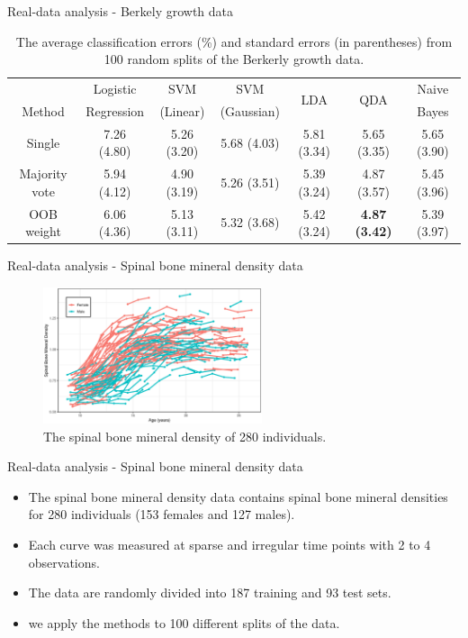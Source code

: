 \documentclass{beamer}
\begin{document}
\begin{frame}{Real-data analysis - Berkely growth data}
	\begin{table}[ht]
		\footnotesize
		\centering
		\caption{The average classification errors (\%) and standard errors (in parentheses) from 100 random splits of the Berkerly growth data.}\label{t4}
		\tabcolsep=6.5pt
		\tiny
		\begin{tabular}{ccccccc}
			\hline \hline
			& Logistic   & SVM      & SVM        &  \multirow{2}{*}{LDA}   &  \multirow{2}{*}{QDA}   & Naive \\
			Method & Regression & (Linear) & (Gaussian) &  &  & Bayes \\ 
			\hline
			Single        & 7.26 (4.80) & 5.26 (3.20) & 5.68 (4.03) & 5.81 (3.34) & 5.65 (3.35) & 5.65 (3.90) \\ 
			Majority vote & 5.94 (4.12) & 4.90 (3.19) & 5.26 (3.51) & 5.39 (3.24) & 4.87 (3.57) & 5.45 (3.96) \\ 
			OOB weight    & 6.06 (4.36) & 5.13 (3.11) & 5.32 (3.68) & 5.42 (3.24) & \textbf{4.87 (3.42)} & 5.39 (3.97) \\
			\hline \hline
		\end{tabular}
	\end{table}
\end{frame}

\begin{frame}{Real-data analysis - Spinal bone mineral density data}
	\begin{figure}[h]
		\centering
		\includegraphics[height=4cm,keepaspectratio=true]{img/spnbmd.eps}
		\caption{The spinal bone mineral density of 280 individuals.}
		\label{fig2}
	\end{figure}
\end{frame}

\begin{frame}{Real-data analysis - Spinal bone mineral density data}
	\begin{itemize}
		\item{
			The spinal bone mineral density data \citep{Bachrach1999} contains spinal bone mineral densities for 280 individuals (153 females and 127 males).
		}
		\item{
			Each curve was measured at sparse and irregular time points with 2 to 4 observations.
		}
		\item{
			The data are randomly divided into 187 training and 93 test sets.
		}
		\item{
			we apply the methods to 100 different splits of the data.
		}
	\end{itemize}
\end{frame}
\end{document}
